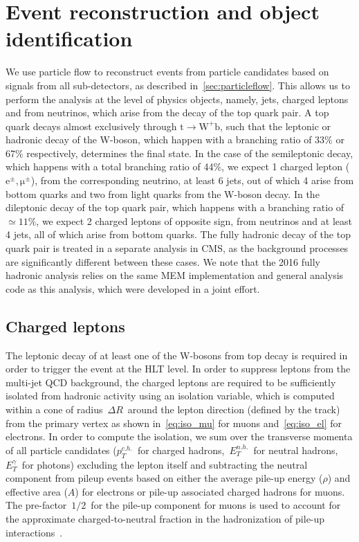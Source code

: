 \section{Event reconstruction and object identification}
\label{sec:object_id}
We use particle flow to reconstruct events from particle candidates based on signals from all sub-detectors, as described in~\cref{sec:particleflow}. This allows us to perform the analysis at the level of physics objects, namely, jets, charged leptons and \MET from neutrinos, which arise from the decay of the top quark pair. A top quark decays almost exclusively through $\mathrm{t} \rightarrow \mathrm{W}^+ \mathrm{b}$, such that the leptonic or hadronic decay of the W-boson, which happen with a branching ratio of 33\% or 67\% respectively, determines the final state. In the case of the semileptonic decay, which happens with a total branching ratio of 44\%, we expect 1 charged lepton ($\mathrm{e}^\pm, \mathrm{\mu}^\pm$), \MET from the corresponding neutrino, at least 6 jets, out of which 4 arise from bottom quarks and two from light quarks from the W-boson decay. In the dileptonic decay of the top quark pair, which happens with a branching ratio of $\simeq11\%$, we expect 2 charged leptons of opposite sign, \MET from neutrinos and at least 4 jets, all of which arise from bottom quarks. The fully hadronic decay of the top quark pair is treated in a separate analysis in CMS, as the background processes are significantly different between these cases. We note that the 2016 \ttHbb fully hadronic analysis relies on the same MEM implementation and general analysis code as this analysis, which were developed in a joint effort.

\subsection{Charged leptons}
\label{sec:object_id_lep}

The leptonic decay of at least one of the W-bosons from top decay is required in order to trigger the event at the HLT level. In order to suppress leptons from the multi-jet QCD background, the charged leptons are required to be sufficiently isolated from hadronic activity using an isolation variable, which is computed within a cone of radius~$\Delta R$~around the lepton direction (defined by the track) from the primary vertex as shown in~\cref{eq:iso_mu} for muons and~\cref{eq:iso_el} for electrons. In order to compute the isolation, we sum over the transverse momenta of all particle candidates ($p_T^{c.h.}$~for charged hadrons,~$E_T^{n.h.}$~for neutral hadrons,~$E_T^{\gamma}$~for photons) excluding the lepton itself and subtracting the neutral component from pileup events based on either the average pile-up energy ($\rho$) and effective area ($A$) for electrons or pile-up associated charged hadrons for muons. The pre-factor~$1/2$~for the pile-up component for muons is used to account for the approximate charged-to-neutral fraction in the hadronization of pile-up interactions~\cite{CMS:2012}.


